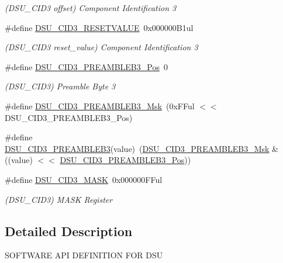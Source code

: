 \begin{DoxyCompactItemize}
\begin{DoxyCompactList}\small\item\em (D\+S\+U\+\_\+\+C\+I\+D3 offset) Component Identification 3 \end{DoxyCompactList}\item 
\#define \mbox{\hyperlink{group___s_a_m_d21___d_s_u_ga8cfe3b4da150c87da70eccd4c07280f4}{D\+S\+U\+\_\+\+C\+I\+D3\+\_\+\+R\+E\+S\+E\+T\+V\+A\+L\+UE}}~0x000000\+B1ul
\begin{DoxyCompactList}\small\item\em (D\+S\+U\+\_\+\+C\+I\+D3 reset\+\_\+value) Component Identification 3 \end{DoxyCompactList}\item 
\#define \mbox{\hyperlink{group___s_a_m_d21___d_s_u_gad11a14455b5f888c07616d9c56808b09}{D\+S\+U\+\_\+\+C\+I\+D3\+\_\+\+P\+R\+E\+A\+M\+B\+L\+E\+B3\+\_\+\+Pos}}~0
\begin{DoxyCompactList}\small\item\em (D\+S\+U\+\_\+\+C\+I\+D3) Preamble Byte 3 \end{DoxyCompactList}\item 
\#define \mbox{\hyperlink{group___s_a_m_d21___d_s_u_ga371986d5abba79b7e4389d750150cad1}{D\+S\+U\+\_\+\+C\+I\+D3\+\_\+\+P\+R\+E\+A\+M\+B\+L\+E\+B3\+\_\+\+Msk}}~(0x\+F\+Ful $<$$<$ D\+S\+U\+\_\+\+C\+I\+D3\+\_\+\+P\+R\+E\+A\+M\+B\+L\+E\+B3\+\_\+\+Pos)
\item 
\#define \mbox{\hyperlink{group___s_a_m_d21___d_s_u_gaa750f726cef165ba74dd6469057fa7d9}{D\+S\+U\+\_\+\+C\+I\+D3\+\_\+\+P\+R\+E\+A\+M\+B\+L\+E\+B3}}(value)~(\mbox{\hyperlink{group___s_a_m_d21___d_s_u_ga371986d5abba79b7e4389d750150cad1}{D\+S\+U\+\_\+\+C\+I\+D3\+\_\+\+P\+R\+E\+A\+M\+B\+L\+E\+B3\+\_\+\+Msk}} \& ((value) $<$$<$ \mbox{\hyperlink{group___s_a_m_d21___d_s_u_gad11a14455b5f888c07616d9c56808b09}{D\+S\+U\+\_\+\+C\+I\+D3\+\_\+\+P\+R\+E\+A\+M\+B\+L\+E\+B3\+\_\+\+Pos}}))
\item 
\#define \mbox{\hyperlink{group___s_a_m_d21___d_s_u_ga7b551efb4b690585f91a21e36b24215f}{D\+S\+U\+\_\+\+C\+I\+D3\+\_\+\+M\+A\+SK}}~0x000000\+F\+Ful
\begin{DoxyCompactList}\small\item\em (D\+S\+U\+\_\+\+C\+I\+D3) M\+A\+SK Register \end{DoxyCompactList}\end{DoxyCompactItemize}


\subsection{Detailed Description}
S\+O\+F\+T\+W\+A\+RE A\+PI D\+E\+F\+I\+N\+I\+T\+I\+ON F\+OR D\+SU 

